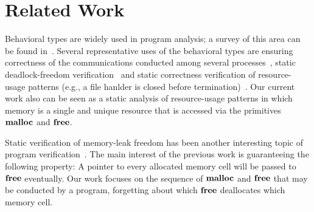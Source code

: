 \section{Related Work}\label{sec:relatedwork}

Behavioral types are widely used in program analysis; a survey of this
area can be found in~\cite{DBLP:journals/csur/HuttelLVCCDMPRT16}.
Several representative uses of the behavioral types are ensuring
correctness of the communications conducted among several
processes~\cite{DBLP:journals/corr/abs-1208-6483,DBLP:conf/popl/HondaYC08,DBLP:journals/tcs/CairesV10,DBLP:journals/tcs/IgarashiK04},
static deadlock-freedom
verification~\cite{DBLP:conf/concur/Kobayashi06,DBLP:journals/acta/Kobayashi05}
and static correctness verification of resource-usage patterns (e.g., a
file hanlder is closed before
termination)~\cite{DBLP:journals/lmcs/KobayashiSW06,DBLP:journals/toplas/IgarashiK05}.
Our current work also can be seen as a static analysis of resource-usage
patterns in which memory is a single and unique resource that is
accessed via the primitives $\mathbf{malloc}$ and $\mathbf{free}$.

Static verification of memory-leak freedom has been another interesting
topic of program
verification~\cite{DBLP:conf/aplas/SuenagaK09,DBLP:conf/pldi/HeineL03,DBLP:conf/sigsoft/XieA05,DBLP:journals/scp/SwamyHMGJ06,DBLP:conf/sas/OrlovichR06,DBLP:conf/issta/SuiYX12}.
The main interest of the previous work is guaranteeing the following
property: A pointer to every allocated memory cell will be passed to
$\mathbf{free}$ eventually.  Our work focuses on the sequence of
$\mathbf{malloc}$ and $\mathbf{free}$ that may be conducted by a program, forgetting
about which $\mathbf{free}$ deallocates which memory cell.


